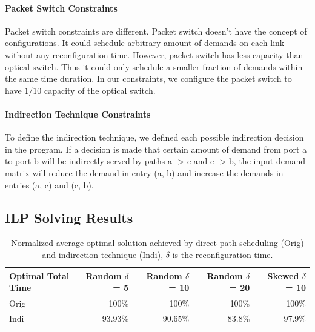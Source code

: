 \paragraph{Packet Switch Constraints}
Packet switch constraints are different. Packet switch doesn't have the concept
of configurations. It could schedule arbitrary amount of demands on each link
without any reconfiguration time. However, packet switch has less capacity than
optical switch. Thus it could only schedule a smaller fraction of demands within
the same time duration. In our constraints, we configure the packet switch to
have $1/10$ capacity of the optical switch. 

\paragraph{Indirection Technique Constraints}  
To define the indirection technique, we defined each possible indirection decision
in the program. If a decision is made that certain amount of demand from port a
to port b will be indirectly served by paths a -> c and c -> b, the input demand matrix
will reduce the demand in entry (a, b) and increase the demands in entries (a, c)
and (c, b). 

\subsection{ILP Solving Results}

\begin{table}
\centering
{
\begin{tabular}{l|r|r|r|r}
\toprule
\bf Optimal Total Time & \bf Random $\delta$ = 5 & \bf Random $\delta$ = 10 & \bf Random $\delta$ = 20 & \bf Skewed $\delta$ = 10 \\
\midrule
Orig & 100\% & 100\% & 100\% & 100\% \\
Indi & 93.93\% & 90.65\% & 83.8\% & 97.9\% \\
\bottomrule
\end{tabular}
}
\caption{Normalized average optimal solution achieved by direct path scheduling (Orig) and indirection technique (Indi), $\delta$ is the reconfiguration time.}
\label{tab:ilp}
\end{table}

